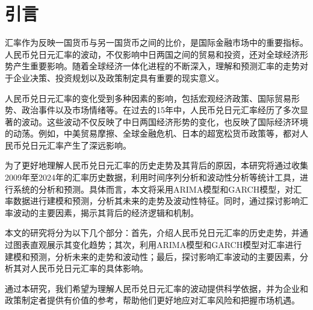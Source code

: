 
\chapter{引言}

汇率作为反映一国货币与另一国货币之间的比价，是国际金融市场中的重要指标。人民币兑日元汇率的波动，不仅影响中日两国之间的贸易和投资，还对全球经济形势产生重要影响。随着全球经济一体化进程的不断深入，理解和预测汇率的走势对于企业决策、投资规划以及政策制定具有重要的现实意义。

人民币兑日元汇率的变化受到多种因素的影响，包括宏观经济政策、国际贸易形势、政治事件以及市场情绪等。在过去的15年中，人民币兑日元汇率经历了多次显著的波动。这些波动不仅反映了中日两国经济形势的变化，也反映了国际经济环境的动荡。例如，中美贸易摩擦、全球金融危机、日本的超宽松货币政策等，都对人民币兑日元汇率产生了深远影响。

为了更好地理解人民币兑日元汇率的历史走势及其背后的原因，本研究将通过收集2009年至2024年的汇率历史数据，利用时间序列分析和波动性分析等统计工具，进行系统的分析和预测。具体而言，本文将采用ARIMA模型和GARCH模型，对汇率数据进行建模和预测，分析其未来的走势及波动性特征。同时，通过探讨影响汇率波动的主要因素，揭示其背后的经济逻辑和机制。

本文的研究将分为以下几个部分：首先，介绍人民币兑日元汇率的历史走势，并通过图表直观展示其变化趋势；其次，利用ARIMA模型和GARCH模型对汇率进行建模和预测，分析未来的走势和波动性；最后，探讨影响汇率波动的主要因素，分析其对人民币兑日元汇率的具体影响。

通过本研究，我们希望为理解人民币兑日元汇率的波动提供科学依据，并为企业和政策制定者提供有价值的参考，帮助他们更好地应对汇率风险和把握市场机遇。